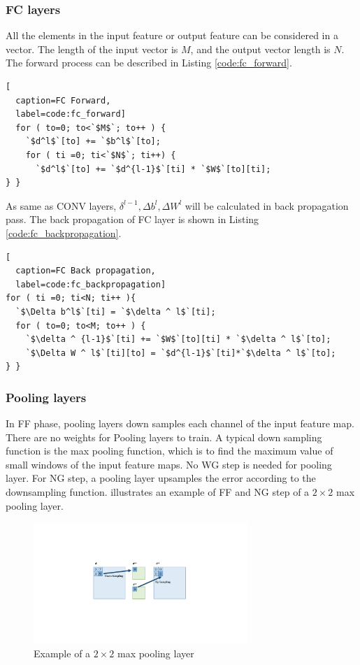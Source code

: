 \subsubsection{FC layers} \label{sec:prelim:fc}

All the elements in the input feature or output feature can be considered in a vector. The length of the input vector is $M$, and the output vector length is $N$. The forward process can be described in Listing \ref{code:fc_forward}.

\begin{minipage}{\linewidth}
\begin{lstlisting}[
  caption=FC Forward,
  label=code:fc_forward]
  for ( to=0; to<`$M$`; to++ ) {
    `$d^l$`[to] += `$b^l$`[to];
    for ( ti =0; ti<`$N$`; ti++) {
      `$d^l$`[to] += `$d^{l-1}$`[ti] * `$W$`[to][ti];
} }
\end{lstlisting}
\end{minipage}

As same as CONV layers,  $\delta ^{l-1} , \Delta b^l, \Delta W^l$ will be calculated in back propagation pass. The back propagation of FC layer is shown in Listing \ref{code:fc_backpropagation}.

\begin{minipage}{\linewidth}
\begin{lstlisting}[
  caption=FC Back propagation,
  label=code:fc_backpropagation]
for ( ti =0; ti<N; ti++ ){
  `$\Delta b^l$`[ti] = `$\delta ^ l$`[ti];
  for ( to=0; to<M; to++ ) {
    `$\delta ^ {l-1}$`[ti] += `$W$`[to][ti] * `$\delta ^ l$`[to];     
    `$\Delta W ^ l$`[ti][to] = `$d^{l-1}$`[ti]*`$\delta ^ l$`[to];
} }
\end{lstlisting}
\end{minipage}

\subsubsection{Pooling layers}
In FF phase, pooling layers down samples each channel of the input feature map. There are no weights for Pooling layers to train. A typical down sampling function is the max pooling function, which is to find the maximum value of small windows of the input feature maps. No WG step is needed for pooling layer. For NG step, a pooling layer upsamples the error according to the downsampling function.  illustrates an example of FF and NG step of a $2\times 2$ max pooling layer.
\begin{figure}[htbp]
    \centering\includegraphics[width=3.2in]{figures/pool.pdf}
    \caption{Example of a $2\times 2$ max pooling layer}\label{fig:pool}
\end{figure}